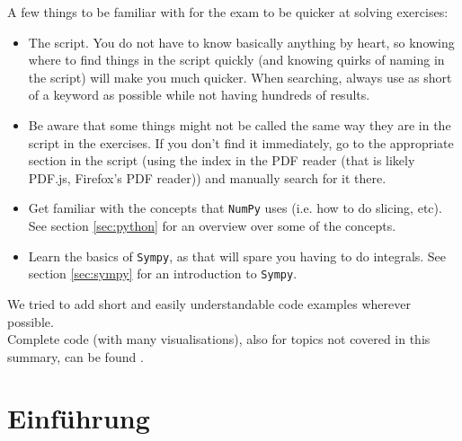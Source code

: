 \documentclass{article}
\begin{document}
A few things to be familiar with for the exam to be quicker at solving exercises:
\begin{itemize}
    \item The script. You do not have to know basically anything by heart, so knowing where to find things in the script quickly (and knowing quirks of naming in the script)
          will make you much quicker. When searching, always use as short of a keyword as possible while not having hundreds of results.
    \item Be aware that some things might not be called the same way they are in the script in the exercises.
          If you don't find it immediately, go to the appropriate section in the script (using the index in the PDF reader (that is likely PDF.js, Firefox's PDF reader))
          and manually search for it there.
    \item Get familiar with the concepts that \texttt{NumPy} uses (i.e. how to do slicing, etc). See section \ref{sec:python} for an overview over some of the concepts.
    \item Learn the basics of \texttt{Sympy}, as that will spare you having to do integrals. See section \ref{sec:sympy} for an introduction to \texttt{Sympy}.
\end{itemize}


We tried to add short and easily understandable code examples wherever possible.\\
Complete code (with many visualisations), also for topics not covered in this summary, can be found .



\newsection
\section{Einführung}




\newsection
\end{document}
